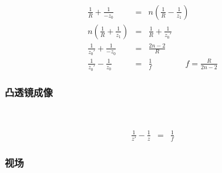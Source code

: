 \documentclass{beamer}
\begin{document}
{{{{\begin{frame}
\end{frame}}{\begin{frame}
  \frametitle{}
  \begin{eqnarray*}
    \frac{1}{R} + \frac{1}{- z_0} & = & n \left( \frac{1}{R} - \frac{1}{z_1}
    \right)\\
    n \left( \frac{1}{R} + \frac{1}{z_1} \right) & = & \frac{1}{R} +
    \frac{1}{z_0'}\\
    \frac{1}{z_0'} + \frac{1}{- z_0} & = & \frac{2 n - 2}{R}\\
    \frac{1}{z_0'} - \frac{1}{z_0} & = & \frac{1}{f} \hspace{4em} f =
    \frac{R}{2 n - 2}
  \end{eqnarray*}
\end{frame}}{\begin{frame}
  \frametitle{凸透镜成像}
  
  \
  
  {\hspace{4em}}
  \begin{eqnarray*}
    \frac{1}{z'} - \frac{1}{z} & = & \frac{1}{f}
  \end{eqnarray*}
\end{frame}}{\begin{frame}
  \frametitle{视场}
  

\end{frame}}}}}
\end{document}
